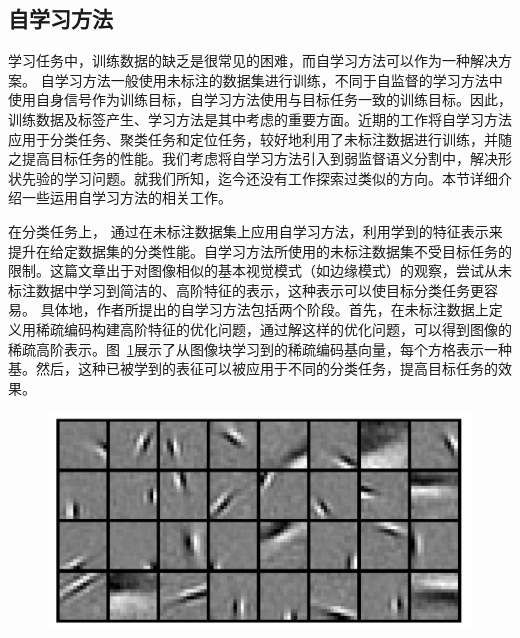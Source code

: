 \subsection{自学习方法} \label{sec:rel_stl}
学习任务中，训练数据的缺乏是很常见的困难，而自学习方法可以作为一种解决方案。
自学习方法一般使用未标注的数据集进行训练，不同于自监督的学习方法中使用自身信号作为训练目标，自学习方法使用与目标任务一致的训练目标。因此，训练数据及标签产生、学习方法是其中考虑的重要方面。近期的工作将自学习方法应用于分类任务\citep{raina2007self,wang2013robust,feng2020autoencoder}、聚类任务\citep{li2017self,dai2008self}和定位任务\citep{bazzani2016self,jie2017deep}，较好地利用了未标注数据进行训练，并随之提高目标任务的性能。我们考虑将自学习方法引入到弱监督语义分割中，解决形状先验的学习问题。就我们所知，迄今还没有工作探索过类似的方向。本节详细介绍一些运用自学习方法的相关工作。

在分类任务上，\citet{raina2007self} 通过在未标注数据集上应用自学习方法，利用学到的特征表示来提升在给定数据集的分类性能。自学习方法所使用的未标注数据集不受目标任务的限制。这篇文章出于对图像相似的基本视觉模式（如边缘模式）的观察，尝试从未标注数据中学习到简洁的、高阶特征的表示，这种表示可以使目标分类任务更容易。
具体地，作者所提出的自学习方法包括两个阶段。首先，在未标注数据上定义用稀疏编码构建高阶特征的优化问题，通过解这样的优化问题，可以得到图像的稀疏高阶表示。图~\ref{c2_fig7}展示了从图像块学习到的稀疏编码基向量，每个方格表示一种基。然后，这种已被学到的表征可以被应用于不同的分类任务，提高目标任务的效果。
    \begin{figure}[tbp]
        \centering 
        \includegraphics[width=1.0\textwidth]{img/c2/rel_b1.png}
        \label{c2_fig7}
    \end{figure}

